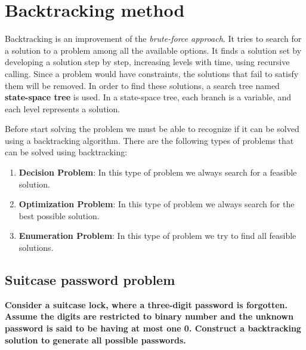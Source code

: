 \documentclass[a4paper,11pt]{book}
\begin{document}
\section{Backtracking method}

\noindent Backtracking is an improvement of the \textit{brute-force approach}. It tries to search for a solution to a problem among all the available options. It finds a solution set by developing a solution step by step, increasing levels with time, using recursive calling. Since a problem would have constraints, the solutions that fail to satisfy them will be removed. In order to find these solutions, a search tree named \textbf{state-space tree} is used. In a state-space tree, each branch is a variable, and each level represents a solution.
\vspace{4mm}

\noindent Before start solving the problem we must be able to recognize if it can be solved using a backtracking algorithm. There are the following types of problems that can be solved using backtracking:
\begin{enumerate}
    \item \textbf{Decision Problem}: In this type of problem we always search for a feasible solution.
    \item \textbf{Optimization Problem}: In this type of problem we always search for the best possible solution.
    \item \textbf{Enumeration Problem}: In this type of problem we try to find all feasible solutions.
\end{enumerate}
\subsection{Suitcase password problem}

\textbf{Consider a suitcase lock, where a three-digit password is forgotten. Assume the digits are restricted to binary number and the unknown password is said to be having at most one 0. Construct a backtracking solution to generate all possible passwords.}
\end{document}
